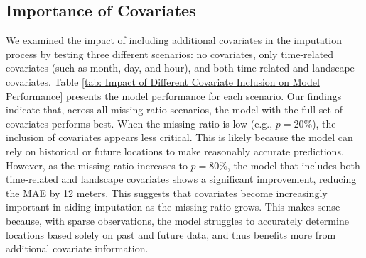 \documentclass[11pt]{article}
\begin{document}
\subsection{Importance of Covariates}

We examined the impact of including additional covariates in the imputation process by testing three different scenarios: no covariates, only time-related covariates (such as month, day, and hour), and both time-related and landscape covariates. Table \ref{tab: Impact of Different Covariate Inclusion on Model Performance} presents the model performance for each scenario. Our findings indicate that, across all missing ratio scenarios, the model with the full set of covariates performs best. When the missing ratio is low (e.g., $p=20\%$), the inclusion of covariates appears less critical. This is likely because the model can rely on historical or future locations to make reasonably accurate predictions. However, as the missing ratio increases to $p=80\%$, the model that includes both time-related and landscape covariates shows a significant improvement, reducing the MAE by 12 meters. This suggests that covariates become increasingly important in aiding imputation as the missing ratio grows. This makes sense because, with sparse observations, the model struggles to accurately determine locations based solely on past and future data, and thus benefits more from additional covariate information.
\end{document}
